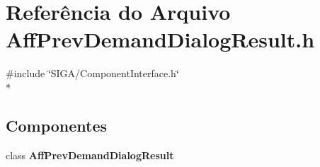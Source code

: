 \section{Referência do Arquivo Aff\+Prev\+Demand\+Dialog\+Result.\+h}
\label{_aff_prev_demand_dialog_result_8h}
{\ttfamily \#include \char`\"{}S\+I\+G\+A/\+Component\+Interface.\+h\char`\"{}}\\*
\subsection*{Componentes}
\begin{DoxyCompactItemize}
\item 
class {\bf Aff\+Prev\+Demand\+Dialog\+Result}
\end{DoxyCompactItemize}
